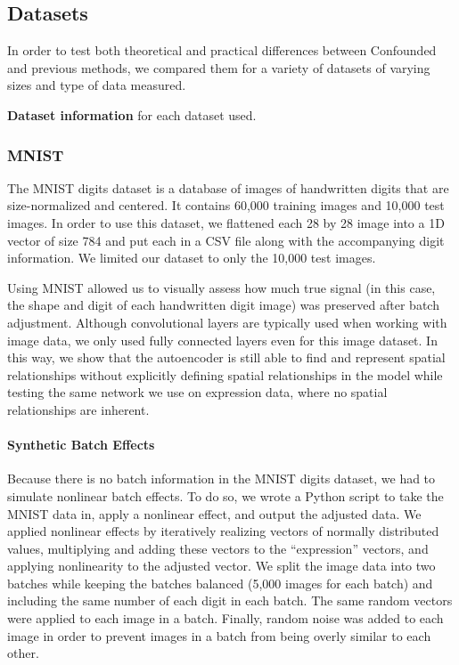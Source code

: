 \documentclass[notitlepage]{article}
\begin{document}
\subsection{Datasets}

In order to test both theoretical and practical differences between Confounded and previous methods, we compared them for a variety of datasets of varying sizes and type of data measured.

\begin{table}
	\centering
	
	\caption{\textbf{Dataset information} for each dataset used.}
	\label{tab:datasets}
\end{table}

\subsubsection{MNIST}

The MNIST digits dataset \cite{lecun_mnist_nodate} is a database of images of handwritten digits that are size-normalized and centered.
It contains 60,000 training images and 10,000 test images.
In order to use this dataset, we flattened each 28 by 28 image into a 1D vector of size 784 and put each in a CSV file along with the accompanying digit information.
We limited our dataset to only the 10,000 test images.

Using MNIST allowed us to visually assess how much true signal (in this case, the shape and digit of each handwritten digit image) was preserved after batch adjustment.
Although convolutional layers are typically used when working with image data, we only used fully connected layers even for this image dataset.
In this way, we show that the autoencoder is still able to find and represent spatial relationships without explicitly defining spatial relationships in the model while testing the same network we use on expression data, where no spatial relationships are inherent.

\paragraph{Synthetic Batch Effects}

Because there is no batch information in the MNIST digits dataset, we had to simulate nonlinear batch effects.
To do so, we wrote a Python script to take the MNIST data in, apply a nonlinear effect, and output the adjusted data.
We applied nonlinear effects by iteratively realizing vectors of normally distributed values, multiplying and adding these vectors to the ``expression'' vectors, and applying nonlinearity to the adjusted vector.
We split the image data into two batches while keeping the batches balanced (5,000 images for each batch) and including the same number of each digit in each batch.
The same random vectors were applied to each image in a batch.
Finally, random noise was added to each image in order to prevent images in a batch from being overly similar to each other.
\end{document}
